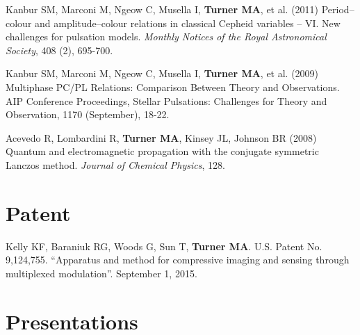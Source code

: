 \documentclass[letterpaper,11pt,oneside]{article}
\begin{document}
\begin{hangparas}{0.25in}{1}
    Kanbur SM, Marconi M, Ngeow C, Musella I, \textbf{Turner MA}, et al. (2011) Period–colour and amplitude–colour relations in classical Cepheid variables – VI. New challenges for pulsation models. \emph{Monthly Notices of the Royal Astronomical Society}, 408 (2), 695-700.

    Kanbur SM, Marconi M, Ngeow C, Musella I, \textbf{Turner MA}, et al. (2009) Multiphase PC/PL Relations: Comparison Between Theory and Observations. AIP Conference Proceedings, Stellar Pulsations: Challenges for Theory and Observation, 1170 (September), 18-22.

    Acevedo R, Lombardini R, \textbf{Turner MA}, Kinsey JL, Johnson BR (2008)
    Quantum and electromagnetic propagation with the conjugate symmetric
    Lanczos method. \emph{Journal of Chemical Physics}, 128.
    
  \end{hangparas}

\noindent
\section*{\textcolor{gunmetal}{Patent}}

  \begin{hangparas}{0.25in}{1}
  Kelly KF, Baraniuk RG, Woods G, Sun T, \textbf{Turner MA}. U.S. Patent No. 9,124,755. 
  ``Apparatus and method for compressive imaging and sensing through multiplexed modulation''.
  September 1, 2015.

    
  \end{hangparas}



\noindent

\section*{\textcolor{gunmetal}{Presentations}}
\end{document}
